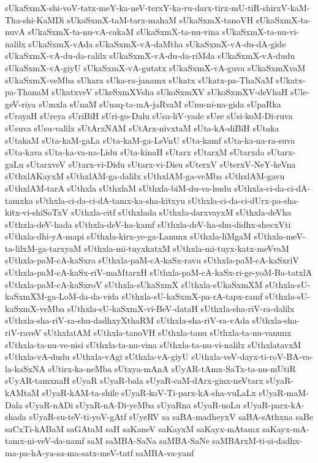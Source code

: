 {sUkaSxmX-shi-voV-tatx-meY-ka-neV-terxY-ka-ru-darx-tirx-mU-tiR-shirxV-kaM-Tha-shi-KaMDi
sUkaSxmX-taM-tarx-mahaM
sUkaSxmX-tanoVH
sUkaSxmX-ta-nuvA
sUkaSxmX-ta-nu-vA-cakaM
sUkaSxmX-ta-nu-vina
sUkaSxmX-ta-nu-vi-nalilx
sUkaSxmX-vAda
sUkaSxmX-vA-daMtha
sUkaSxmX-vA-du-dA-gide
sUkaSxmX-vA-du-da-ralilx
sUkaSxmX-vA-du-da-riMda
sUkaSxmX-vA-dudu
sUkaSxmX-vA-giyU
sUkaSxmX-vA-gutatx
sUkaSxmX-vA-guva
sUkaSxmXvaM
sUkaSxmX-veMba
sUkara
sUka-ra-janamx
sUkatx
sUkatx-pa-ThaNaM
sUkatx-pa-ThanaM
sUkatxveV
sUkeSxmXVsha
sUkoSxmXV
sUkoSxmXV-deVhaH
sUle-geV-riya
sUmxla
sUnaM
sUnaq-ta-mA-jaRvaM
sUnu-ni-na-gida
sUpaRka
sUrayaH
sUreya
sUriBiH
sUri-go-Dalu
sUsa-liV-yade
sUse
sUsi-koM-Di-ruva
sUsuva
sUsu-valilx
sUtArxNAM
sUtArx-nivxtaM
sUta-kA-diBiH
sUtaka
sUtakaM
sUta-kaM-gaLa
sUta-kaM-ga-LeVnU
sUta-kamf
sUta-ka-na-ra-suva
sUta-kava
sUta-ka-va-na-Lidu
sUta-kinaH
sUtarx
sUtarxM
sUtarxda
sUtarx-gaLu
sUtarxveV
sUtarx-vi-Didu
sUtarx-vi-Disu
sUterxV
sUterxV-NeY-keVna
sUthxlAKayxM
sUthxlAM-ga-dalilx
sUthxlAM-ga-veMba
sUthxlAM-gavu
sUthxlAM-tarA
sUthxla
sUthxlaM
sUthxla-biM-du-va-hudu
sUthxla-ci-da-ci-dA-tamxka
sUthxla-ci-da-ci-dA-tamx-ka-sha-kitxyu
sUthxla-ci-da-ci-dUrx-pa-sha-kitx-vi-shiSoTxV
sUthxla-citf
sUthxlada
sUthxla-darxvayxM
sUthxla-deVha
sUthxla-deV-hada
sUthxla-deV-ha-kamf
sUthxla-deV-ha-shu-didhx-shecxVti
sUthxla-dhi-yA-mapi
sUthxla-kirx-ye-ga-Lanunx
sUthxla-liMgaM
sUthxla-meV-ta-lilxM-ga-tarxyaM
sUthxla-mi-tuyxkatxM
sUthxla-mi-tuyx-katx-meVvaM
sUthxla-paM-cA-kaSxra
sUthxla-paM-cA-kaSx-ravu
sUthxla-paM-cA-kaSxriV
sUthxla-paM-cA-kaSx-riV-maMtarxH
sUthxla-paM-cA-kaSx-ri-ge-yoM-Ba-tatxlA
sUthxla-paM-cA-kaSxroV
sUthxla-sUkaSxmX
sUthxla-sUkaSxmXM
sUthxla-sU-kaSxmXM-ga-LoM-da-da-vida
sUthxla-sU-kaSxmX-pa-rA-tapx-ramf
sUthxla-sU-kaSxmX-veMba
sUthxla-sU-kaSxmX-vi-BeV-dataH
sUthxla-sha-riV-ra-dalilx
sUthxla-sha-riV-ra-shu-dadhxyXthaRM
sUthxla-sha-riV-ra-vAda
sUthxla-sha-riV-raveV
sUthxlatAM
sUthxla-tanoVH
sUthxla-tanu
sUthxla-ta-nu-vanunx
sUthxla-ta-nu-ve-nisi
sUthxla-ta-nu-vina
sUthxla-ta-nu-vi-nalilx
sUthxlatavxM
sUthxla-vA-dudu
sUthxla-vAgi
sUthxla-vA-giyU
sUthxla-veV-dayx-ti-roV-BA-va-la-kaSxNA
sUtirx-ka-neMba
sUtxya-mAnA
sUyAR-tAmx-SaTx-ta-nu-mUtiR
sUyAR-tamxnaH
sUyaR
sUyaR-bala
sUyaR-caM-dArx-ginx-neVtarx
sUyaR-kAMtaM
sUyaR-kAM-ta-shile
sUyaR-koV-Ti-parx-kA-sha-vuLaLx
sUyaR-maM-Dala
sUyaR-nADi
sUyaR-nA-Di-yeMba
sUyaRna
sUyaR-noLu
sUyaR-parx-kA-shada
sUyaR-su-teV-ti-yoV-gAtf
sUyeRV
sa
saBA-madheyxV
saBA-sAthxna
saBe
saCxTi-kABaM
saGAtaM
saH
saKaneV
saKayxM
saKayx-mAtamx
saKayx-mA-tamx-ni-veV-da-namf
saM
saMBA-SaNa
saMBA-SaNe
saMBArxM-ti-si-dadhx-ma-pa-hA-ya-sa-ma-satx-meV-tatf
saMBA-va-yanf
}
